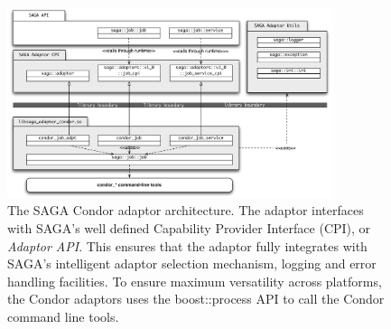 \begin{figure}
  \includegraphics[angle=90, width=0.85\textwidth]{./figures/condor_adaptor_arch} 
  \caption{\footnotesize
  The SAGA Condor adaptor architecture. The adaptor interfaces with
  SAGA's well defined Capability Provider Interface (CPI),
  or \textit{Adaptor API}.  This ensures that the adaptor fully
  integrates with SAGA's intelligent adaptor selection mechanism,
  logging and error handling facilities. To ensure maximum versatility
  across platforms, the Condor adaptors uses the boost::process API to
  call the Condor command line tools. }
  
\label{adaptor_arch}
\end{figure}






